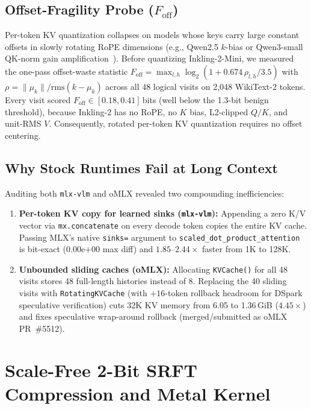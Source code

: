 \documentclass[conference]{IEEEtran}
\newcommand{\Foff}{F_{\mathrm{off}}}
\begin{document}
\subsection{Offset-Fragility Probe ($\Foff$)}
Per-token KV quantization collapses on models whose keys carry large constant offsets in slowly rotating RoPE dimensions (e.g., Qwen2.5 $k$-bias or Qwen3-small QK-norm gain amplification~\cite{jonasson2025rotaryoffset}). Before quantizing Inkling-2-Mini, we measured the one-pass offset-waste statistic $\Foff = \max_{l,h} \log_2(1 + 0.674\,\rho_{l,h}/3.5)$ with $\rho = \|\mu_k\|/\mathrm{rms}(k-\mu_k)$ across all 48 logical visits on 2{,}048 WikiText-2 tokens. Every visit scored $\Foff \in [0.18, 0.41]$\,bits (well below the 1.3-bit benign threshold), because Inkling-2 has no RoPE, no $K$ bias, L2-clipped $Q/K$, and unit-RMS $V$. Consequently, rotated per-token KV quantization requires no offset centering.

\subsection{Why Stock Runtimes Fail at Long Context}
Auditing both \texttt{mlx-vlm} and oMLX revealed two compounding inefficiencies:
\begin{enumerate}
    \item \textbf{Per-token KV copy for learned sinks (\texttt{mlx-vlm}):} Appending a zero K/V vector via \texttt{mx.concatenate} on every decode token copies the entire KV cache. Passing MLX's native \texttt{sinks=} argument to \texttt{scaled\_dot\_product\_attention} is bit-exact ($0.00\text{e+00}$ max diff) and $1.85\text{--}2.44\times$ faster from 1K to 128K.
    \item \textbf{Unbounded sliding caches (oMLX):} Allocating \texttt{KVCache()} for all 48 visits stores 48 full-length histories instead of 8. Replacing the 40 sliding visits with \texttt{RotatingKVCache} (with $+16$-token rollback headroom for DSpark speculative verification) cuts 32K KV memory from 6.05 to 1.36\,GiB ($4.45\times$) and fixes speculative wrap-around rollback (merged/submitted as oMLX PR~\#5512).
\end{enumerate}

\section{Scale-Free 2-Bit SRFT Compression and Metal Kernel}
\label{sec:method}
\end{document}
